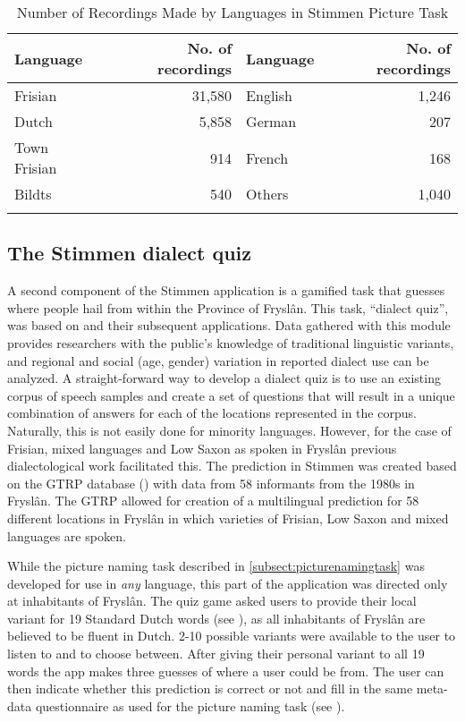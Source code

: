 \documentclass[output=paper,hidelinks]{langscibook}
\begin{document}
\begin{table}
\begin{tabularx}{\textwidth}{lr@{\qquad\qquad}Xr}

\lsptoprule

{\bfseries Language} & {\bfseries No. of recordings} & {\bfseries Language} & {\bfseries No. of recordings}\\
\midrule
Frisian & 31,580 & English & 1,246\\
Dutch & 5,858 & German & 207\\
Town Frisian & 914 & French & 168\\
Bildts & 540 & Others & 1,040\\
\lspbottomrule
\end{tabularx}

\caption{Number of Recordings Made by Languages in Stimmen Picture Task}
\label{tab:hilton:1}
\end{table}

\subsection{The Stimmen dialect quiz}

A second component of the Stimmen application is a gamified task that guesses where people hail from within the Province of Fryslân. This task, “dialect quiz”, was based on \citet{LeemannKolly2013} and their subsequent applications. Data gathered with this module provides researchers with the public’s knowledge of traditional linguistic variants, and regional and social (age, gender) variation in reported dialect use can be analyzed. A straight-forward way to develop a dialect quiz is to use an existing corpus of speech samples and create a set of questions that will result in a unique combination of answers for each of the locations represented in the corpus. Naturally, this is not easily done for minority languages. However, for the case of Frisian, mixed languages and Low Saxon as spoken in Fryslân previous dialectological work facilitated this. The prediction in Stimmen was created based on the GTRP database (\citeyear{goeman}) with data from 58 informants from the 1980s in Fryslân. The GTRP allowed for creation of a multilingual prediction for 58 different locations in Fryslân in which varieties of Frisian, Low Saxon and mixed languages are spoken. 

While the picture naming task described in \ref{subsect:picturenamingtask} was developed for use in \textit{any} language, this part of the application was directed only at inhabitants of Fryslân. The quiz game asked users to provide their local variant for 19 Standard Dutch words (see ), as all inhabitants of Fryslân are believed to be fluent in Dutch. 2-10 possible variants were available to the user to listen to and to choose between. After giving their personal variant to all 19 words the app makes three guesses of where a user could be from. The user can then indicate whether this prediction is correct or not and fill in the same meta-data questionnaire as used for the picture naming task (see ).
\end{document}

